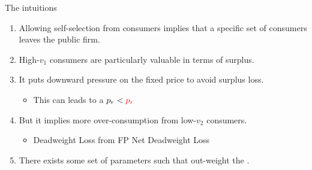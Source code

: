 \documentclass{class}
\begin{document}

\begin{frame}{The intuitions}\label{WelfareComp}

\begin{enumerate}
    \item Allowing self-selection from consumers implies that a specific set of consumers leaves the public firm. \vfill
    \item High-$v_1$ consumers are particularly valuable in terms of surplus. \vfill
    \item It puts downward pressure on the fixed price to avoid surplus loss.
    \begin{itemize}
        \item This can leads to a $p_r < \textcolor{red}{p_r}$ \vfill 
    \end{itemize}
    \item But it implies more over-consumption from low-$v_2$ consumers. 
    \begin{itemize}
        \item Deadweight Loss from FP  \hyperlink{Plot_DW_DW}{} 
    Net Deadweight Loss \hyperlink{Net_DW}{} 
    \end{itemize} \vfill 
     \item There exists some set of parameters such that  out-weight the .
\end{enumerate}
    
\end{frame}

\end{document}
